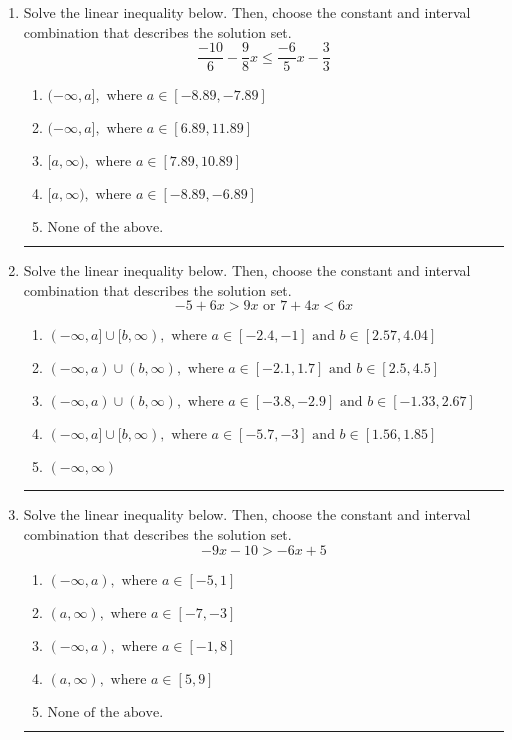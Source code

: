 \documentclass[14pt]{extbook}
\newcommand{\litem}[1]{\item#1\hspace*{-1cm}\rule{\textwidth}{0.4pt}}
\begin{document}
\begin{enumerate}
{\begin{enumerate}[label=\Alph*.]
\end{enumerate} }
\litem{
Solve the linear inequality below. Then, choose the constant and interval combination that describes the solution set.\[ \frac{-10}{6} - \frac{9}{8} x \leq \frac{-6}{5} x - \frac{3}{3} \]\begin{enumerate}[label=\Alph*.]
\item \( (-\infty, a], \text{ where } a \in [-8.89, -7.89] \)
\item \( (-\infty, a], \text{ where } a \in [6.89, 11.89] \)
\item \( [a, \infty), \text{ where } a \in [7.89, 10.89] \)
\item \( [a, \infty), \text{ where } a \in [-8.89, -6.89] \)
\item \( \text{None of the above}. \)

\end{enumerate} }
\litem{
Solve the linear inequality below. Then, choose the constant and interval combination that describes the solution set.\[ -5 + 6 x > 9 x \text{ or } 7 + 4 x < 6 x \]\begin{enumerate}[label=\Alph*.]
\item \( (-\infty, a] \cup [b, \infty), \text{ where } a \in [-2.4, -1] \text{ and } b \in [2.57, 4.04] \)
\item \( (-\infty, a) \cup (b, \infty), \text{ where } a \in [-2.1, 1.7] \text{ and } b \in [2.5, 4.5] \)
\item \( (-\infty, a) \cup (b, \infty), \text{ where } a \in [-3.8, -2.9] \text{ and } b \in [-1.33, 2.67] \)
\item \( (-\infty, a] \cup [b, \infty), \text{ where } a \in [-5.7, -3] \text{ and } b \in [1.56, 1.85] \)
\item \( (-\infty, \infty) \)

\end{enumerate} }
\litem{
Solve the linear inequality below. Then, choose the constant and interval combination that describes the solution set.\[ -9x -10 > -6x + 5 \]\begin{enumerate}[label=\Alph*.]
\item \( (-\infty, a), \text{ where } a \in [-5, 1] \)
\item \( (a, \infty), \text{ where } a \in [-7, -3] \)
\item \( (-\infty, a), \text{ where } a \in [-1, 8] \)
\item \( (a, \infty), \text{ where } a \in [5, 9] \)
\item \( \text{None of the above}. \)


\end{enumerate}}
\end{enumerate}
\end{document}
